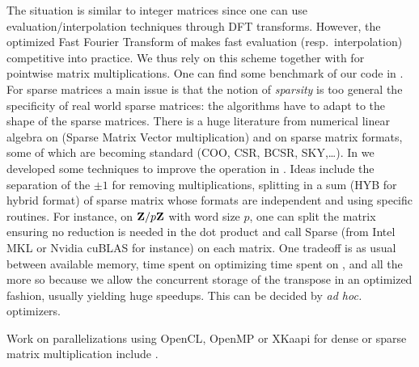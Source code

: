 %
%
The situation is similar to integer matrices since one can use
evaluation/interpolation techniques through DFT transforms. However, the
optimized Fast Fourier Transform of \cite{Harvey:2014}  makes fast evaluation
(resp.\ interpolation) competitive into practice. We thus rely on this scheme
together with \fgemm for pointwise matrix multiplications. One can find some
benchmark of our code in \cite{GioLeb14}.
%
%
For sparse matrices a main issue is that the notion of \emph{sparsity}
is too general \vs the specificity of real world sparse matrices: the
algorithms have to adapt to the shape of the sparse matrices.
%
There is a huge literature from numerical linear algebra  on \spmv (Sparse
Matrix Vector multiplication) and on sparse matrix formats, some of which are
becoming standard (COO, CSR, BCSR, SKY,\ldots).  In \cite{Boyer:2010:spmv} we
developed some techniques to improve the \spmv operation in \linbox. Ideas
include the separation of the $\pm 1$ for removing multiplications, splitting
in a sum (HYB for hybrid format) of sparse matrix  whose formats are
independent and using specific routines. For instance, on $\mathbf{Z}{/ p\mathbf{Z}}$ with
word size $p$, one can split the matrix ensuring no reduction is needed  in the
dot product and call Sparse \blas (from Intel \textsf{MKL} or Nvidia
\textsf{cuBLAS} for instance) on each matrix. One tradeoff is as usual between
available memory, time spent on optimizing \vs time spent on \apply, and all
the more so because we allow the concurrent storage of the transpose in an
optimized fashion, usually yielding huge speedups. This can be decided by
\emph{ad hoc.\ } optimizers.
%
\par
Work on parallelizations using \textsf{OpenCL}, \textsf{OpenMP} or
\textsf{XKaapi} for dense or sparse matrix multiplication include
\cite{Boyer:2010:spmv,WST12,DGPZ14}.

\begin{comment} %
\paragraph{}
These state-of-the-art algorithms, often interdependent, need to be selected
by the \mul solution, possibly using a Method/Helper parameter. The
Controller/Module model works particularly well here: cascading, switch
methods, algorithms selection is made easy. Besides, the choosing of a
particular algorithms or base case is never settled in advance: the library has
to be tuned wrt. available libraries, local performance of these libraries.
\end{comment}

